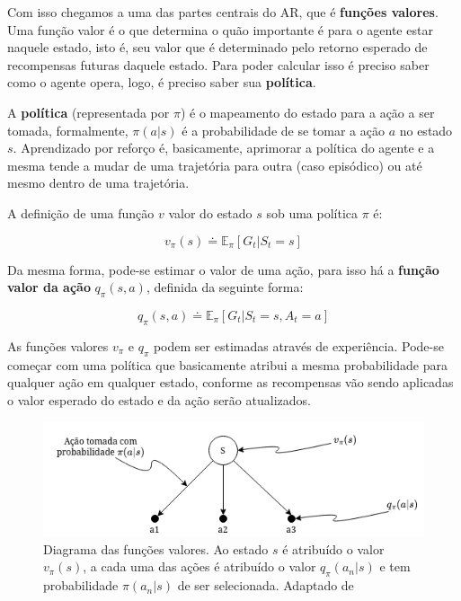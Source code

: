 Com isso chegamos a uma das partes centrais do AR, que é \textbf{funções valores}. Uma função valor é o que determina o quão importante é para o agente estar naquele estado, isto é, seu valor que é determinado pelo retorno esperado de recompensas futuras daquele estado. Para poder calcular isso é preciso saber como o agente opera, logo, é preciso saber sua \textbf{política}.

A \textbf{política} (representada por $\pi$) é o mapeamento do estado para a ação a ser tomada, formalmente, $\pi(a|s)$ é a probabilidade de se tomar a ação $a$ no estado $s$. Aprendizado por reforço é, basicamente, aprimorar a política do agente e a mesma tende a mudar de uma trajetória para outra (caso episódico) ou até mesmo dentro de uma trajetória.

A definição de uma função $v$ valor do estado $s$ sob uma política $\pi$ é:

\begin{equation} \label{state-value-function}
   v_\pi(s) \doteq \mathbb{E}_\pi[G_t|S_t=s]
\end{equation}

Da mesma forma, pode-se estimar o valor de uma ação, para isso há a \textbf{função valor da ação} $q_\pi(s,a)$, definida da seguinte forma:

\begin{equation} \label{action-value-function}
   q_\pi(s,a) \doteq \mathbb{E}_\pi[G_t|S_t=s,A_t=a]
\end{equation}

As funções valores $v_\pi$ e $q_\pi$ podem ser estimadas através de experiência. Pode-se começar com uma política que basicamente atribui a mesma probabilidade para qualquer ação em qualquer estado, conforme as recompensas vão sendo aplicadas o valor esperado do estado e da ação serão atualizados. 

\begin{figure}[h]
   \centering
   \includegraphics[scale=0.75]{figs/action-selection-diagram.drawio.png}
    \caption{Diagrama das funções valores. Ao estado $s$ é atribuído o valor $v_\pi(s)$, a cada uma das ações é atribuído o valor $q_\pi(a_n|s)$ e tem probabilidade $\pi(a_n|s)$ de ser selecionada. Adaptado de }
    \label{fig:policy-diagram}
 \end{figure}

